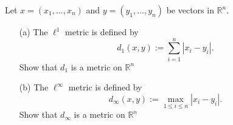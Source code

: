 \begin{problem}[20 pts]  
Let $x=(x_1,\dots,x_n)$ and $y=(y_1,\dots,y_n)$ be vectors in $\mathbb{R}^n$.

\vfill
\bigskip

\begin{enumerate}
\item[(a)] The $\ell^1$ metric is defined by
\[
d_1(x,y) := \sum_{i=1}^n |x_i - y_i|.
\]
Show that $d_1$ is a metric on $\mathbb{R}^n$


\item[(b)] The $\ell^\infty$ metric is defined by
\[
d_\infty(x,y) := \max_{1 \leq i \leq n} |x_i - y_i|.
\]
Show that $d_{\infty}$ is a metric on $\mathbb{R}^n$

\end{enumerate}
\end{problem}


